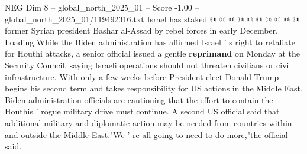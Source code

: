 \begin{textsample}{NEG Dim 8 – global\_north\_2025\_01 – Score -1.00 – global\_north\_2025\_01/119492316.txt}
Israel has staked @ @ @ @ @ @ @ @ @ @ former Syrian president Bashar al-Assad by rebel forces in early December.
Loading While the Biden administration has affirmed Israel ' s right to retaliate for Houthi attacks, a senior official issued a gentle \textbf{reprimand} on Monday at the Security Council, saying Israeli operations should not threaten civilians or civil infrastructure.
With only a few weeks before President-elect Donald Trump begins his second term and takes responsibility for US actions in the Middle East, Biden administration officials are cautioning that the effort to contain the Houthis ' rogue military drive must continue.
A second US official said that additional military and diplomatic action may be needed from countries within and outside the Middle East."We ' re all going to need to do more,"the official said.

\end{textsample}
